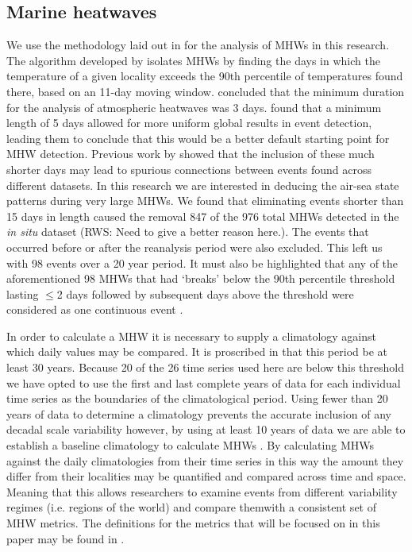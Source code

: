 \documentclass[a4paper,10pt,review]{elsarticle}
\begin{document}
\subsection{Marine heatwaves}
We use the methodology laid out in \citet{Hobday2016} for the analysis of MHWs in this research. The algorithm developed by \citet{Hobday2016} isolates MHWs by finding the days in which the temperature of a given locality exceeds the 90th percentile of temperatures found there, based on an 11-day moving window. \citet{Perkins2013} concluded that the minimum duration for the analysis of atmospheric heatwaves was 3 days. \citet{Hobday2016} found that a minimum length of 5 days allowed for more uniform global results in event detection, leading them to conclude that this would be a better default starting point for MHW detection. Previous work by \citet{Schlegel2017} showed that the inclusion of these much shorter days may lead to spurious connections between events found across different datasets. In this research we are interested in deducing the air-sea state patterns during very large MHWs. We found that eliminating events shorter than 15 days in length caused the removal 847 of the 976 total MHWs detected in the \emph{in situ} dataset (RWS: Need to give a better reason here.). The events that occurred before or after the reanalysis period were also excluded. This left us with 98 events over a 20 year period. It must also be highlighted that any of the aforementioned 98 MHWs that had `breaks' below the 90th percentile threshold lasting $\leq$2 days followed by subsequent days above the threshold were considered as one continuous event \citep{Hobday2016}.

In order to calculate a MHW it is necessary to supply a climatology against which daily values may be compared. It is proscribed in \citet{Hobday2016} that this period be at least 30 years. Because 20 of the 26 time series used here are below this threshold we have opted to use the first and last complete years of data for each individual time series as the boundaries of the climatological period. Using fewer than 20 years of data to determine a climatology prevents the accurate inclusion of any decadal scale variability \citep{Schlegel2016} however, by using at least 10 years of data we are able to establish a baseline climatology to calculate MHWs \citep{Schlegel2017}. By calculating MHWs against the daily climatologies from their time series in this way the amount they differ from their localities may be quantified and compared across time and space. Meaning that this allows researchers to examine events from different variability regimes (i.e. regions of the world) and compare themwith a consistent set of MHW metrics. The definitions for the metrics that will be focused on in this paper may be found in .
\end{document}

